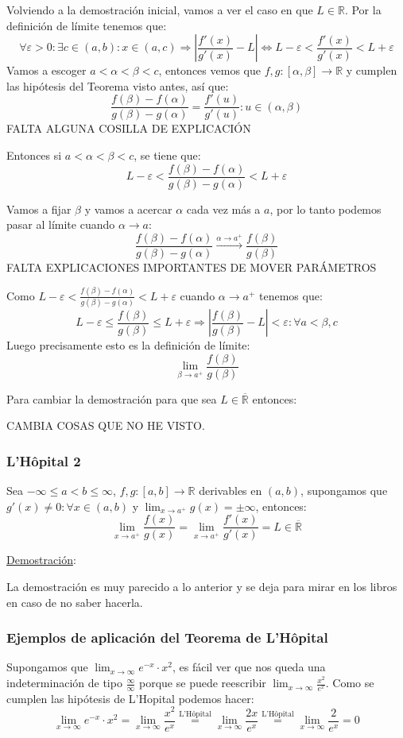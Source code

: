 \documentclass[10pt,a4paper,openright]{book}
\begin{document}
Volviendo a la demostración inicial, vamos a ver el caso en que $L\in \mathbb R$. Por la definición de límite tenemos que:
$$\forall \varepsilon>0: \exists c\in (a,b): x\in (a,c)\Rightarrow \left|\frac{f'(x)}{g'(x)}-L\right|\Leftrightarrow L-\varepsilon< \frac{f'(x)}{g'(x)}< L+\varepsilon$$
Vamos a escoger $a<\alpha<\beta < c$, entonces vemos que $f,g: [\alpha,\beta]\rightarrow \mathbb R$ y cumplen las hipótesis del Teorema visto antes, así que:
$$\frac{f(\beta)-f(\alpha)}{g(\beta)-g(\alpha)}=\frac{f'(u)}{g'(u)}: u\in (\alpha, \beta)$$
FALTA ALGUNA COSILLA DE EXPLICACIÓN

Entonces si $a<\alpha < \beta < c$, se tiene que:
$$L-\varepsilon< \frac{f(\beta)- f(\alpha)}{g(\beta)-g(\alpha)}<L+\varepsilon$$

Vamos a fijar $\beta$ y vamos a acercar $\alpha $ cada vez más a $a$, por lo tanto podemos pasar al límite cuando $\alpha \rightarrow a$:
$$\frac{f(\beta)-f(\alpha)}{g(\beta)-g(\alpha)}\xrightarrow{\alpha\rightarrow a^+} \frac{f(\beta)}{g(\beta)}$$
FALTA EXPLICACIONES IMPORTANTES DE MOVER PARÁMETROS

Como $L-\varepsilon < \frac{f(\beta)- f(\alpha)}{g(\beta)-g(\alpha)}<L+\varepsilon$ cuando $\alpha \rightarrow a^+$ tenemos que:
$$L-\varepsilon \leq \frac{ f(\beta)}{g(\beta)}\leq L+\varepsilon\Rightarrow \left|\frac{f(\beta)}{g(\beta)}-L\right|<\varepsilon: \forall a<\beta, c$$
Luego precisamente esto es la definición de límite:
$$\lim_{\beta\rightarrow a^+}\frac{f(\beta)}{g(\beta)}$$

Para cambiar la demostración para que sea $L\in \overline{\mathbb R}$ entonces:

CAMBIA COSAS QUE NO HE VISTO.

\subsubsection*{L'Hôpital 2}
Sea $-\infty\leq a < b \leq \infty$, $f,g: [a,b]\rightarrow \mathbb R$ derivables en $(a,b)$, supongamos que $g'(x)\neq 0: \forall x\in (a,b)$ y $\lim_{x\rightarrow a^+}g(x)=\pm\infty$, entonces:
$$\lim_{x\rightarrow a^+}\frac{f(x)}{g(x)}=\lim_{x\rightarrow a^+}\frac{f'(x)}{g'(x)}=L\in \overline{\mathbb R}$$

\underline{Demostración}:

La demostración es muy parecido a lo anterior y se deja para mirar en los libros en caso de no saber hacerla.

\subsubsection*{Ejemplos de aplicación del Teorema de L'Hôpital}
Supongamos que $\lim_{x\rightarrow \infty} e^{-x} \cdot x^2$, es fácil ver que nos queda una indeterminación de tipo $\frac{\infty}{\infty}$ porque se puede reescribir $\lim_{x\rightarrow \infty}\frac{x^2}{e^x}$. Como se cumplen las hipótesis de L'Hopital podemos hacer:
$$\lim_{x\rightarrow \infty} e^{-x} \cdot x^2=\lim_{x\rightarrow \infty}\frac{x^2}{e^x}\stackrel{\mbox{L'Hôpital}}{=}\lim_{x\rightarrow \infty}\frac{2x}{e^x}\stackrel{\mbox{L'Hôpital}}{=}\lim_{x\rightarrow \infty}\frac{2}{e^x}=0$$
\end{document}

